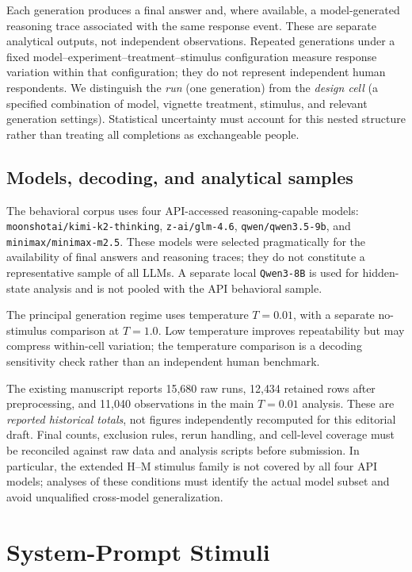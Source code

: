 Each generation produces a final answer and, where available, a model-generated reasoning trace associated with the same response event. These are separate analytical outputs, not independent observations. Repeated generations under a fixed model--experiment--treatment--stimulus configuration measure response variation within that configuration; they do not represent independent human respondents. We distinguish the \emph{run} (one generation) from the \emph{design cell} (a specified combination of model, vignette treatment, stimulus, and relevant generation settings). Statistical uncertainty must account for this nested structure rather than treating all completions as exchangeable people.

\subsection{Models, decoding, and analytical samples}

The behavioral corpus uses four API-accessed reasoning-capable models: \texttt{moonshotai/kimi-k2-thinking}, \texttt{z-ai/glm-4.6}, \texttt{qwen/qwen3.5-9b}, and \texttt{minimax/minimax-m2.5}. These models were selected pragmatically for the availability of final answers and reasoning traces; they do not constitute a representative sample of all LLMs. A separate local \texttt{Qwen3-8B} is used for hidden-state analysis and is not pooled with the API behavioral sample.

The principal generation regime uses temperature $T=0.01$, with a separate no-stimulus comparison at $T=1.0$. Low temperature improves repeatability but may compress within-cell variation; the temperature comparison is a decoding sensitivity check rather than an independent human benchmark.

The existing manuscript reports 15{,}680 raw runs, 12{,}434 retained rows after preprocessing, and 11{,}040 observations in the main $T=0.01$ analysis. These are \emph{reported historical totals}, not figures independently recomputed for this editorial draft. Final counts, exclusion rules, rerun handling, and cell-level coverage must be reconciled against raw data and analysis scripts before submission. In particular, the extended H--M stimulus family is not covered by all four API models; analyses of these conditions must identify the actual model subset and avoid unqualified cross-model generalization.

\section{System-Prompt Stimuli}

